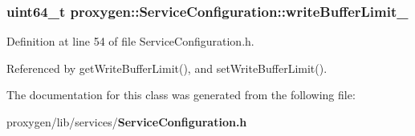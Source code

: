 \subsubsection[{write\+Buffer\+Limit\+\_\+}]{\setlength{\rightskip}{0pt plus 5cm}uint64\+\_\+t proxygen\+::\+Service\+Configuration\+::write\+Buffer\+Limit\+\_\+\hspace{0.3cm}{\ttfamily [private]}}\label{classproxygen_1_1ServiceConfiguration_ad9eb8641b61d2903cf3d2cdfd1a5d766}


Definition at line 54 of file Service\+Configuration.\+h.



Referenced by get\+Write\+Buffer\+Limit(), and set\+Write\+Buffer\+Limit().



The documentation for this class was generated from the following file\+:\begin{DoxyCompactItemize}
\item 
proxygen/lib/services/{\bf Service\+Configuration.\+h}\end{DoxyCompactItemize}

